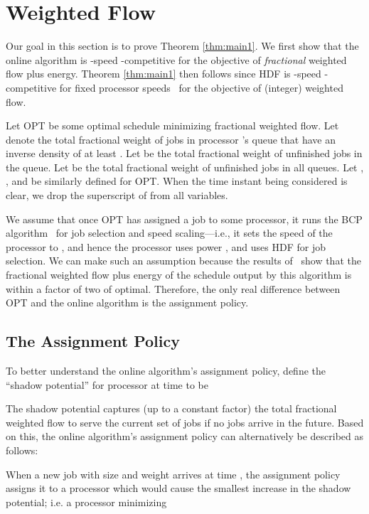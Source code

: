 \documentclass[11pt]{article}
\newcommand{\opt}{\textrm{\sc OPT}\xspace}
\newcommand{\bcp}{{\sf BCP}\xspace}
\begin{document}
\section{Weighted Flow}
\label{sec:weighted-flow-time}

Our goal in this section is to prove Theorem \ref{thm:main1}.
We first show that the online algorithm is -speed
-competitive for the objective of
\emph{fractional} weighted flow plus energy. Theorem \ref{thm:main1}
then follows since HDF is
-speed
-competitive for fixed processor speeds~\cite{BLMP1}
for the objective of (integer) weighted flow.

Let \opt be some
optimal schedule minimizing fractional weighted flow.
Let 
denote the total fractional weight of jobs in processor
's queue that have an inverse density of at least .
Let  be
the total fractional weight of unfinished jobs in the queue.
Let  be
the total fractional weight of unfinished jobs in all queues.
Let
,
, and
 be similarly defined for \opt.
When the time instant being considered is clear, we drop the superscript of  from all variables.



We assume that once \opt
has assigned a job to some processor, it runs the \bcp
algorithm~\cite{BCP} for job selection and speed scaling---i.e., it sets
the speed of the  processor to , and hence
the  processor uses power ,
and uses HDF for job selection.
We can make such an assumption because the results of~\cite{BCP} show that the
fractional weighted flow plus energy of the schedule output by this algorithm is within a factor of two of
optimal.  Therefore, the only real difference between \opt and the online algorithm is the
assignment policy.





\subsection{The Assignment Policy}

To better understand the online algorithm's assignment policy,
define the ``shadow potential'' for processor  at time  to be

The shadow potential captures (up to a constant factor) the total fractional weighted flow to serve the current set of jobs if no jobs arrive in the
future.
Based on this, the online algorithm's assignment policy can alternatively be described as follows:


\medskip {} When a new job with size  and weight 
arrives at time , the assignment policy assigns it
to a processor which would cause the smallest increase in the
shadow potential; i.e. a processor minimizing
\end{document}
